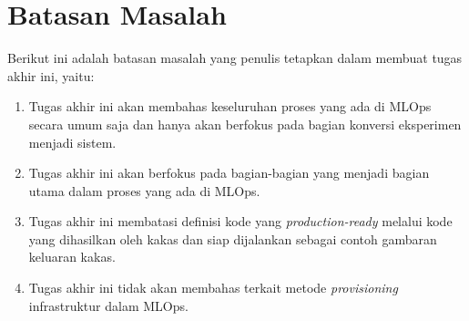 \section{Batasan Masalah}

Berikut ini adalah batasan masalah yang penulis tetapkan dalam membuat tugas akhir ini, yaitu:

\begin{enumerate}
  \item Tugas akhir ini akan membahas keseluruhan proses yang ada di MLOps secara umum saja dan hanya akan berfokus pada bagian konversi eksperimen menjadi sistem.
  \item Tugas akhir ini akan berfokus pada bagian-bagian yang menjadi bagian utama dalam proses yang ada di MLOps.
  \item Tugas akhir ini membatasi definisi kode yang \textit{production-ready} melalui kode yang dihasilkan oleh kakas dan siap dijalankan sebagai contoh gambaran keluaran kakas.
  \item Tugas akhir ini tidak akan membahas terkait metode \textit{provisioning} infrastruktur dalam MLOps. 
\end{enumerate}